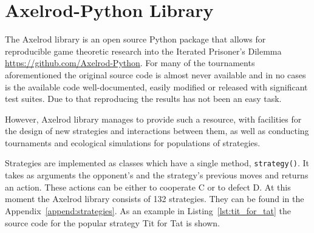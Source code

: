 \section{Axelrod-Python Library}

The Axelrod library \cite{axelrodproject} is an open source Python package that allows for
reproducible game theoretic research into the Iterated Prisoner's Dilemma
\url{https://github.com/Axelrod-Python}.
For many of the tournaments aforementioned the original source code is almost never
available and in no cases is the available code well-documented, easily modified
or released with significant test suites. Due to that reproducing the results
has not been an easy task.

However, Axelrod library manages to provide such a resource, with facilities for
the design of new strategies and interactions between them, as well as
conducting tournaments and ecological simulations for populations of strategies.

Strategies are implemented as classes which have a single method, \texttt{strategy()}.
It takes as arguments the opponent's and the strategy's previous moves and returns
an action. These actions can be either to cooperate C or to defect D. At this
moment the Axelrod library consists of 132 strategies. They can be found in the
Appendix~\ref{append:strategies}.
As an example in Listing~\ref{lst:tit_for_tat} the source code for the
popular strategy Tit for Tat is shown.


